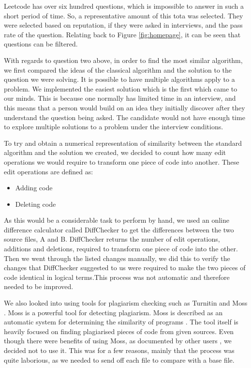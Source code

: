 \documentclass[10pt,twocolumn]{IEEEtran}
\begin{document}
\par Leetcode has over six hundred questions, which is impossible to answer in such a short period of time. So, a representative amount of this tota was selected. They were selected based on reputation, if they were asked in interviews, and the pass rate of the question. Relating back to Figure \ref{fig:homepage}, it can be seen that questions can be filtered.
\par With regards to question two above, in order to find the most similar algorithm, we first compared the ideas of the classical algorithm and the solution to the question we were solving. It is possible to have multiple algorithms apply to a problem. We implemented the easiest solution which is the first which came to our minds. This is because one normally has limited time in an interview, and this means that a person would build on an idea they initially discover after they understand the question being asked. The candidate would not have enough time to explore multiple solutions to a problem under the interview conditions. 
\par To try and obtain a numerical representation of similarity between the standard algorithm and the solution we created, we decided to count how many edit operations we would require to transform one piece of code into another. These edit operations are defined as: 
\begin{itemize}
\item Adding code
\item Deleting code
\end{itemize}
As this would be a considerable task to perform by hand, we used an online difference calculator called DiffChecker \cite{diff} to get the differences between the two source files, A and B. DiffChecker returns the number of edit operations, additions and deletions, required to transform one piece of code into the other. Then we went through the listed changes manually, we did this to verify the changes that DiffChecker suggested to us were required to make the two pieces of code identical in logical terms.This process was not automatic and therefore needed to be improved. 
\par We also looked into using tools for plagiarism checking such as Turnitin and Moss \cite{Schleimer:2003:WLA:872757.872770}. Moss is a powerful tool for detecting plagiarism. Moss is described as an automatic system for determining the similarity of programs \cite{mosswebsite}. The tool itself is heavily focused on finding plagiarised pieces of code from given sources. Even though there were benefits of using Moss, as documented by other users \cite{MossBowyer}, we decided not to use it. This was for a few reasons, mainly that the process was quite laborious, as we needed to send off each file to compare with a base file. 
\end{document}
